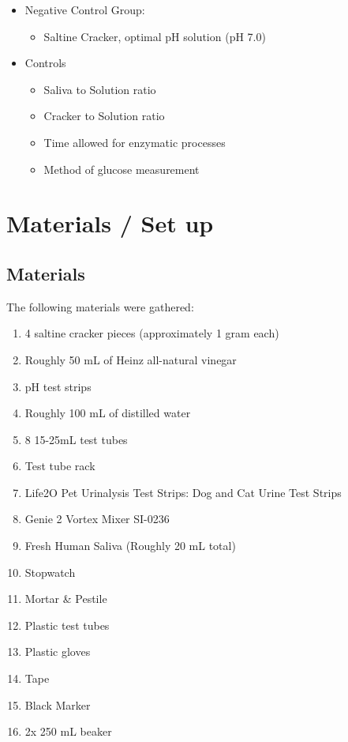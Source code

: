 \documentclass[letterpaper]{article}
\def\tightlist{}
\begin{document}
\begin{doublespace}
\begin{itemize}
  \begin{itemize}
  \tightlist
  \item
    Saltine Cracker, Saliva, optimal pH solution (pH 7.0)
  \end{itemize}
\item
  Negative Control Group:

  \begin{itemize}
  \tightlist
  \item
    Saltine Cracker, optimal pH solution (pH 7.0)
  \end{itemize}
\item
  Controls

  \begin{itemize}
  \tightlist
  \item
    Saliva to Solution ratio
  \item
    Cracker to Solution ratio
  \item
    Time allowed for enzymatic processes
  \item
    Method of glucose measurement
  \end{itemize}
\end{itemize}

\section{Materials / Set up}\label{materials-set-up}

\subsection{Materials}\label{materials}

The following materials were gathered:

\begin{enumerate}
\def\labelenumi{\arabic{enumi}.}
\tightlist
\item
  4 saltine cracker pieces (approximately 1 gram each)
\item
  Roughly 50 mL of Heinz all-natural vinegar
\item
  pH test strips
\item
  Roughly 100 mL of distilled water
\item
  8 15-25mL test tubes
\item
  Test tube rack
\item
  Life2O Pet Urinalysis Test Strips: Dog and Cat Urine Test Strips
\item
  Genie 2 Vortex Mixer SI-0236
\item
  Fresh Human Saliva (Roughly 20 mL total)
\item
  Stopwatch
\item
  Mortar \& Pestile
\item
  Plastic test tubes
\item
  Plastic gloves
\item
  Tape
\item
  Black Marker
\item
  2x 250 mL beaker
\end{enumerate}


\end{doublespace}
\end{document}
